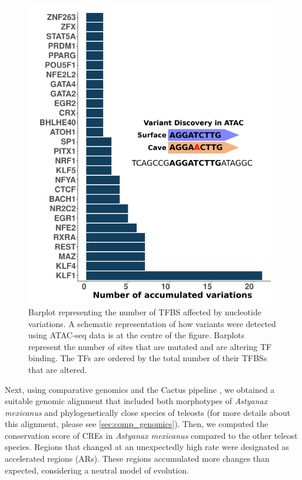 \begin{figure}
\centering
\includegraphics[width=1\textwidth]{Figures/astyanax/motifbrakr_tobias_results}
\caption[Motifbreakr and Tobias results]{Barplot representing the number of TFBS affected by nucleotide variations. A schematic representation of how variants were detected using ATAC-seq data is at the centre of the figure. Barplots represent the number of sites that are mutated and are altering TF binding. The TFs are ordered by the total number of their TFBSs that are altered.}
\label{fig:Motifbreakr_tobias}
\end{figure}


Next, using comparative genomics and the Cactus pipeline \parencite{armstrong_progressive_2020}, we obtained a suitable genomic alignment that included both morphotypes of \textit{Astyanax mexicanus} and phylogenetically close species of teleosts (for more details about this alignment, please see \ref{sec:comp_genomics}). Then, we computed the conservation score of CREs in \textit{Astyanax mexicanus} compared to the other teleost species. Regions that changed at an unexpectedly high rate were designated as accelerated regions (ARs). These regions accumulated more changes than expected, considering a neutral model of evolution. 

